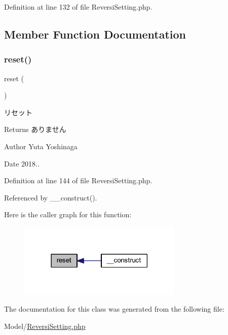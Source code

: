 Definition at line 132 of file Reversi\+Setting.\+php.



\subsection{Member Function Documentation}
\mbox{\label{class_reversi_setting_a4a20559544fdf4dcb457e258dc976cf8}} 
\subsubsection{\texorpdfstring{reset()}{reset()}}
{\footnotesize\ttfamily reset (\begin{DoxyParamCaption}{ }\end{DoxyParamCaption})}



リセット 

\begin{DoxyReturn}{Returns}
ありません 
\end{DoxyReturn}
\begin{DoxyAuthor}{Author}
Yuta Yoshinaga 
\end{DoxyAuthor}
\begin{DoxyDate}{Date}
2018.. 
\end{DoxyDate}


Definition at line 144 of file Reversi\+Setting.\+php.



Referenced by \+\_\+\+\_\+construct().

Here is the caller graph for this function\+:\nopagebreak
\begin{figure}[H]
\begin{center}
\leavevmode
\includegraphics[width=222pt]{class_reversi_setting_a4a20559544fdf4dcb457e258dc976cf8_icgraph}
\end{center}
\end{figure}


The documentation for this class was generated from the following file\+:\begin{DoxyCompactItemize}
\item 
Model/\hyperlink{_reversi_setting_8php}{Reversi\+Setting.\+php}\end{DoxyCompactItemize}
